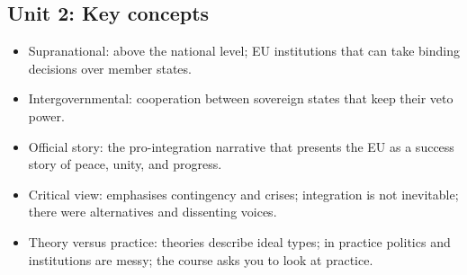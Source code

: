 \documentclass[10pt,a4paper]{article}
\begin{document}
\subsection*{Unit 2: Key concepts}
\begin{itemize}
\item Supranational: above the national level; EU institutions that can take binding decisions over member states.
\item Intergovernmental: cooperation between sovereign states that keep their veto power.
\item Official story: the pro-integration narrative that presents the EU as a success story of peace, unity, and progress.
\item Critical view: emphasises contingency and crises; integration is not inevitable; there were alternatives and dissenting voices.
\item Theory versus practice: theories describe ideal types; in practice politics and institutions are messy; the course asks you to look at practice.
\end{itemize}
\end{document}
